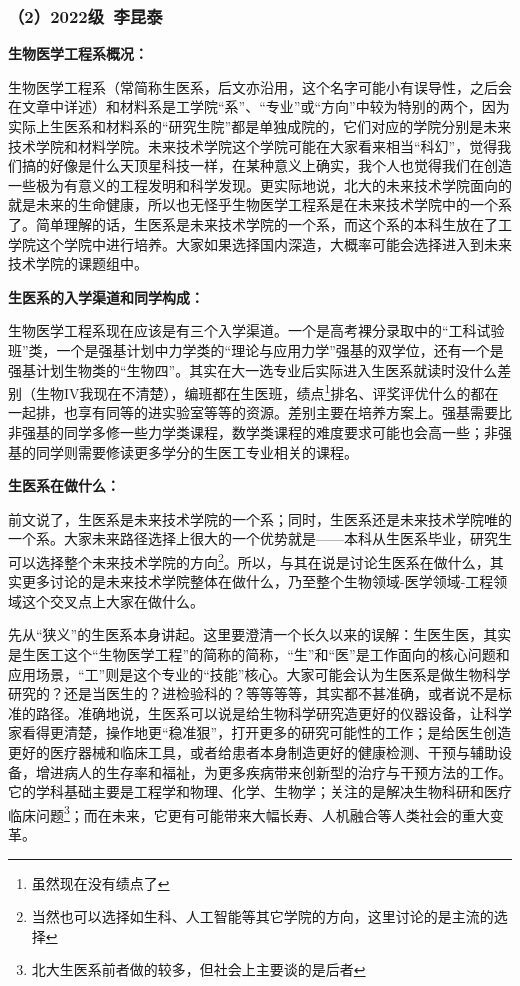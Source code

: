 \documentclass[11pt,oneside]{book}
\begin{document}
\subsubsection{（2）2022级\ 李昆泰}
\textbf{生物医学工程系概况：}

生物医学工程系（常简称生医系，后文亦沿用，这个名字可能小有误导性，之后会在文章中详述）和材料系是工学院“系”、“专业”或“方向”中较为特别的两个，因为实际上生医系和材料系的“研究生院”都是单独成院的，它们对应的学院分别是未来技术学院和材料学院。未来技术学院这个学院可能在大家看来相当“科幻”，觉得我们搞的好像是什么天顶星科技一样，在某种意义上确实，我个人也觉得我们在创造一些极为有意义的工程发明和科学发现。更实际地说，北大的未来技术学院面向的就是未来的生命健康，所以也无怪乎生物医学工程系是在未来技术学院中的一个系了。简单理解的话，生医系是未来技术学院的一个系，而这个系的本科生放在了工学院这个学院中进行培养。大家如果选择国内深造，大概率可能会选择进入到未来技术学院的课题组中。

\vspace{10pt}

\textbf{生医系的入学渠道和同学构成：}

生物医学工程系现在应该是有三个入学渠道。一个是高考裸分录取中的“工科试验班”类，一个是强基计划中力学类的“理论与应用力学”强基的双学位，还有一个是强基计划生物类的“生物四”。其实在大一选专业后实际进入生医系就读时没什么差别（生物IV我现在不清楚），编班都在生医班，绩点\footnote{虽然现在没有绩点了}排名、评奖评优什么的都在一起排，也享有同等的进实验室等等的资源。差别主要在培养方案上。强基需要比非强基的同学多修一些力学类课程，数学类课程的难度要求可能也会高一些；非强基的同学则需要修读更多学分的生医工专业相关的课程。

\vspace{10pt}

\textbf{生医系在做什么：}

前文说了，生医系是未来技术学院的一个系；同时，生医系还是未来技术学院唯的一个系。大家未来路径选择上很大的一个优势就是——本科从生医系毕业，研究生可以选择整个未来技术学院的方向\footnote{当然也可以选择如生科、人工智能等其它学院的方向，这里讨论的是主流的选择}。所以，与其在说是讨论生医系在做什么，其实更多讨论的是未来技术学院整体在做什么，乃至整个生物领域-医学领域-工程领域这个交叉点上大家在做什么。

\vspace{10pt}

先从“狭义”的生医系本身讲起。这里要澄清一个长久以来的误解：生医生医，其实是生医工这个“生物医学工程”的简称的简称，“生”和“医”是工作面向的核心问题和应用场景，“工”则是这个专业的“技能”核心。大家可能会认为生医系是做生物科学研究的？还是当医生的？进检验科的？等等等等，其实都不甚准确，或者说不是标准的路径。准确地说，生医系可以说是给生物科学研究造更好的仪器设备，让科学家看得更清楚，操作地更“稳准狠”，打开更多的研究可能性的工作；是给医生创造更好的医疗器械和临床工具，或者给患者本身制造更好的健康检测、干预与辅助设备，增进病人的生存率和福祉，为更多疾病带来创新型的治疗与干预方法的工作。它的学科基础主要是工程学和物理、化学、生物学；关注的是解决生物科研和医疗临床问题\footnote{北大生医系前者做的较多，但社会上主要谈的是后者}；而在未来，它更有可能带来大幅长寿、人机融合等人类社会的重大变革。
\end{document}
